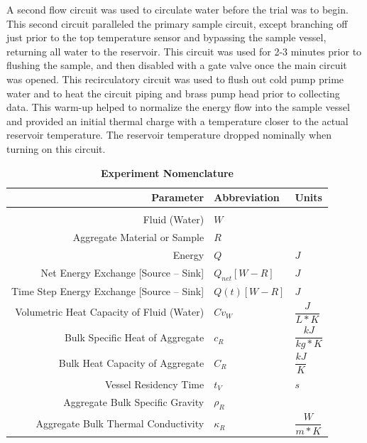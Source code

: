 A second flow circuit was used to circulate water before the trial was to begin. This second circuit paralleled the primary sample circuit, except branching off just prior to the top temperature sensor and bypassing the sample vessel, returning all water to the reservoir. This circuit was used for 2-3 minutes prior to flushing the sample, and then disabled with a gate valve once the main circuit was opened. This recirculatory circuit was used to flush out cold pump prime water and to heat the circuit piping and brass pump head prior to collecting data. This warm-up helped to normalize the energy flow into the sample vessel and provided an initial thermal charge with a temperature closer to the actual reservoir temperature. The reservoir temperature dropped nominally when turning on this circuit. 

\begin{table}[ht!]
\caption[Experiment Nomenclature]{\textbf{Experiment Nomenclature}\label{simNom}}
\centering
\begin{tabular}{r l l}
Parameter & Abbreviation & Units\\
\hline
\\[-.5ex]
Fluid (Water)					&	$W$\\[3mm]

Aggregate Material or Sample			& 	$R$\\[3mm]

Energy						&	$Q$			& $J$\\[3mm]

Net Energy Exchange [Source -- Sink]		&	$Q_{net}[W-R]$		& $J$\\[3mm]

Time Step Energy Exchange [Source -- Sink]	&	$Q(t)[W-R]$		& $J$\\[3mm]

Volumetric Heat Capacity of Fluid (Water)	&	$Cv_{W}$		& $\dfrac{J}{L*K}$\\[3mm]

Bulk Specific Heat of Aggregate			&	$c_{R}$			& $\dfrac{kJ}{kg*K}$\\[3mm]

Bulk Heat Capacity of Aggregate			&	$C_{R}$			& $\dfrac{kJ}{K}$\\[3mm]

Vessel Residency Time 				&	$t_{V}$			& $s$\\[3mm]

Aggregate Bulk Specific Gravity			&	$\rho_{R}$		&\\[3mm]

Aggregate Bulk Thermal Conductivity		&	$\kappa_{R}$		& $\dfrac{W}{m*K}$\\[3mm]


\end{tabular}
\end{table}
